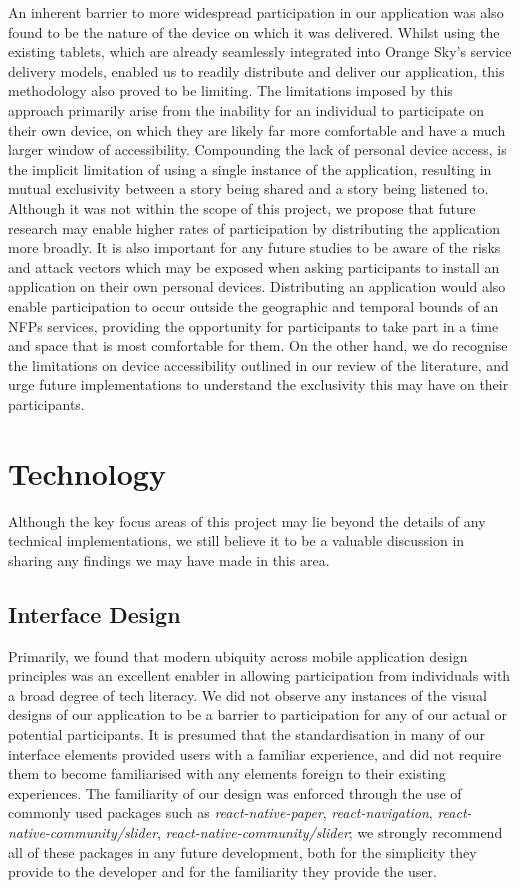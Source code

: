 An inherent barrier to more widespread participation in our application was also found to be the nature of the device on which it was delivered. Whilst using the existing tablets, which are already seamlessly integrated into Orange Sky's service delivery models, enabled us to readily distribute and deliver our application, this methodology also proved to be limiting. The limitations imposed by this approach primarily arise from the inability for an individual to participate on their own device, on which they are likely far more comfortable and have a much larger window of accessibility. Compounding the lack of personal device access, is the implicit limitation of using a single instance of the application, resulting in mutual exclusivity between a story being shared and a story being listened to. Although it was not within the scope of this project, we propose that future research may enable higher rates of participation by distributing the application more broadly. It is also important for any future studies to be aware of the risks and attack vectors which may be exposed when asking participants to install an application on their own personal devices. Distributing an application would also enable participation to occur outside the geographic and temporal bounds of an NFPs services, providing the opportunity for participants to take part in a time and space that is most comfortable for them. On the other hand, we do recognise the limitations on device accessibility outlined in our review of the literature, and urge future implementations to understand the exclusivity this may have on their participants.

\section{Technology}

Although the key focus areas of this project may lie beyond the details of any technical implementations, we still believe it to be a valuable discussion in sharing any findings we may have made in this area.

\subsection{Interface Design}

Primarily, we found that modern ubiquity across mobile application design principles was an excellent enabler in allowing participation from individuals with a broad degree of tech literacy. We did not observe any instances of the visual designs of our application to be a barrier to participation for any of our actual or potential participants. It is presumed that the standardisation in many of our interface elements provided users with a familiar experience, and did not require them to become familiarised with any elements foreign to their existing experiences. The familiarity of our design was enforced through the use of commonly used packages such as \emph{react-native-paper}, \emph{react-navigation}, \emph{react-native-community/slider}, \emph{react-native-community/slider}; we strongly recommend all of these packages in any future development, both for the simplicity they provide to the developer and for the familiarity they provide the user.


